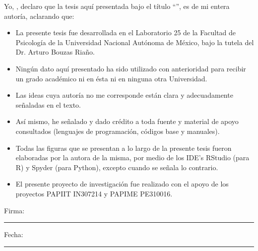 \documentclass[
12pt, %
spanish, %
singlespacing, %
headsepline, %
]{MastersDoctoralThesis} %
\begin{document}
\begin{declaration}
\addchaptertocentry{\authorshipname} %
\noindent Yo, \authorname, declaro que la tesis aquí presentada bajo el título \enquote{\ttitle}, es de mi entera autoría, aclarando que:\\

\begin{itemize} 
\item La presente tesis fue desarrollada en el Laboratorio 25 de la Facultad de Psicología de la Universidad Nacional Autónoma de México, bajo la tutela del Dr. Arturo Bouzas Riaño. 
\item Ningún dato aquí presentado ha sido utilizado con anterioridad para recibir un grado académico ni en ésta ni en ninguna otra Universidad. 
\item Las ideas cuya autoría no me corresponde están clara y adecuadamente señaladas en el texto. 
\item Así mismo, he señalado y dado crédito a toda fuente y material de apoyo consultados (lenguajes de programación, códigos base y manuales).
\item Todas las figuras que se presentan a lo largo de la presente tesis fueron elaboradas por la autora de la misma, por medio de los IDE's RStudio (para R) y Spyder (para Python), excepto cuando se señala lo contrario.
\item El presente proyecto de investigación fue realizado con el apoyo de los proyectos PAPIIT IN307214 y PAPIME PE310016.\\
\end{itemize}
 
\noindent Firma:\\
\rule[0.5em]{25em}{0.5pt} %
 
\noindent Fecha:\\
\rule[0.5em]{25em}{0.5pt} %
\end{declaration}

\cleardoublepage

\end{document}
